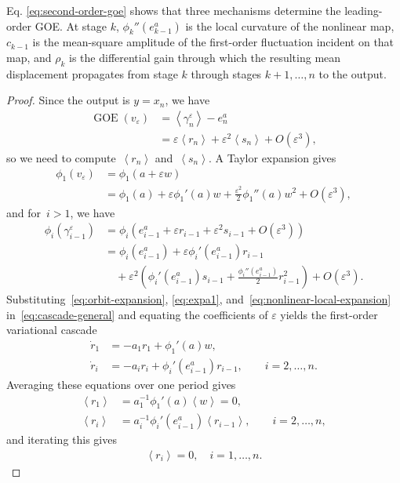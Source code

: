 \documentclass[onecolumn]{IEEEtran}
\newcommand{\GOE}{\operatorname{GOE}}
\newcommand{\avg}[1]{\left\langle #1\right\rangle}
\begin{document}
Eq. \eqref{eq:second-order-goe} shows  that  three mechanisms  
determine the leading-order GOE. At stage $k$, $\phi_k''(e_{k-1}^a)$ is the
local curvature of the nonlinear map, $c_{k-1}$ is the mean-square amplitude
of the first-order fluctuation incident on that map, and $\rho_k$ is the
differential gain through which the resulting mean displacement propagates
from stage $k$ through stages $k+1,\ldots,n$ to the output.

\begin{proof}
Since the output is $y=x_n$,  we have 
\begin{align}\label{eq:goe_pertu}
    \GOE(v_\varepsilon)
    &=
    \avg{\gamma_n^\varepsilon}-e_n^a
    \nonumber\\
    &=
    \varepsilon\avg{r_n}
    +
    \varepsilon^2\avg{s_n}
    +
    O(\varepsilon^3),
\end{align}
so we need to compute~$\avg{r_n}$ and~$\avg{s_n}$. 
A Taylor expansion gives  
\begin{align}\label{eq:expa1}
    \phi_1( v_\varepsilon)
    &= \phi_1(a+\varepsilon w  ) \nonumber\\
    &=\phi_1(a)+\varepsilon \phi_1'(a) w  +
    \frac{\varepsilon^2} {2}   \phi_1'' (a)     w^2 
    +
    O(\varepsilon^3)  , 
\end{align}
and for~$i>1$, we have 
\begin{align}
    \phi_i(\gamma_{i-1}^\varepsilon)
    &= \phi_i( e_{i-1}^a+\varepsilon r_{i-1} 
    +\varepsilon^2 s_{i-1} 
    +O(\varepsilon^3) ) \nonumber\\&=
    \phi_i(e_{i-1}^a)
    +
    \varepsilon \phi_i'(e_{i-1}^a)  r_{i-1}
    \nonumber\\
    &\quad
    +
    \varepsilon^2
    \left(
    \phi_i'(e_{i-1}^a) s_{i-1}
    +
    \frac{\phi_i''(e_{i-1}^a)}{2}r_{i-1}^2
    \right)
    +
    O(\varepsilon^3).
    \label{eq:nonlinear-local-expansion}
\end{align}
Substituting~\eqref{eq:orbit-expansion}, \eqref{eq:expa1},    and~\eqref{eq:nonlinear-local-expansion} in~\eqref{eq:cascade-general} and equating the
coefficients of $\varepsilon$ yields the first-order variational cascade
\begin{align}
    \dot r_1
    &=
    -a_1r_1+\phi_1'( a) w,
     \nonumber\\
    \dot r_i
    &=
    -a_ir_i+\phi_i'(e_{i-1}^a)  r_{i-1},
    \qquad i=2,\ldots,n.
    \label{eq:first-general}
\end{align}
 Averaging these
equations over one period gives
\begin{align*}
    \avg{r_1}
    &=
   a_1^{-1} \phi_1'( a) \avg{w}=0,\\
    \avg{r_i}
    &=
  a_i^{-1}  \phi_i'(e_{i-1}^a) \avg{r_{i-1}},
    \qquad i=2,\ldots,n,
\end{align*}
and  iterating 
this gives 
\begin{align}\label{eq:avg_ri}
    \avg{r_i}=0,\quad 
    i=1,\ldots,n.
\end{align}
 


\end{proof}
\end{document}
